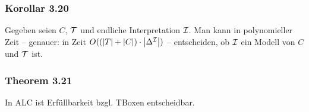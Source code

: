 \subsubsection{Korollar 3.20}\label{korollar-3.20}

Gegeben seien $C$, $\mathcal{T}$ und endliche Interpretation $\mathcal{I}$. Man kann
in polynomieller Zeit -- genauer: in Zeit
$O(\left( \left| T \right| + \left| C \right| \right) \cdot \left| \Delta^{\mathcal{I}} \right|)$
-- entscheiden, ob $\mathcal{I}$ ein Modell von $C$ und $\mathcal{T}$ ist.

\subsubsection{Theorem 3.21}\label{theorem-3.21}

In ALC ist Erfüllbarkeit bzgl. TBoxen entscheidbar.